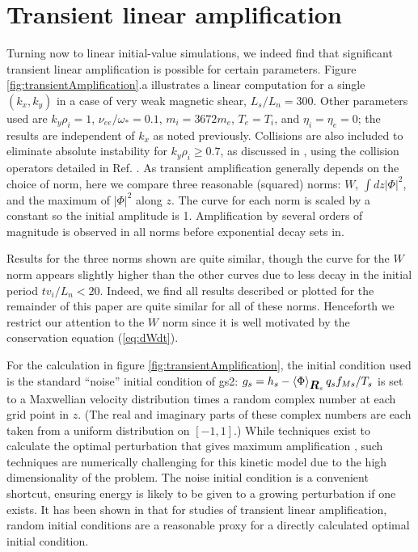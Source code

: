 \documentclass[12pt,superscriptaddress]{revtex4}
\newcommand{\vect}[1]{\mbox{\boldmath $#1$}}
\begin{document}
\section{Transient linear amplification}
\label{sec:transient}

Turning now to linear initial-value simulations,
we indeed find that significant transient linear amplification is possible for certain parameters.
Figure \ref{fig:transientAmplification}.a illustrates
a linear computation for a single $(k_x,k_y)$ in a case of very weak magnetic shear, $L_s / L_n = 300$.
Other parameters used are $k_y \rho_i = 1$, $\nu_{ee} / \omega_* = 0.1$,
$m_i = 3672 m_e$,
$T_e = T_i$, and $\eta_i = \eta_e = 0$;
the results are independent of $k_x$ as noted previously.
Collisions are also included to eliminate absolute instability for $k_y \rho_i \ge 0.7$,
as discussed in \cite{usUniversalInstability},
using the collision operators detailed in Ref. \cite{Abel}.
As transient amplification generally depends on the choice
of norm, here we compare three reasonable (squared) norms: $W$, $\int dz |\Phi|^2$,
and the maximum of $|\Phi|^2$ along $z$.
The curve for each norm is scaled by a constant so the initial amplitude is 1.
Amplification by several orders of magnitude is observed in all norms
before exponential decay sets in.

Results for the three norms shown are quite similar,
though the curve for the $W$ norm appears slightly higher than the other curves
due to less decay in the initial period $t v_i / L_n <20$.
Indeed, we find
all results described or plotted for the remainder of this paper are quite similar
for all of these norms.
Henceforth we restrict our attention to the $W$ norm since it is well motivated
by the conservation equation (\ref{eq:dWdt}).

For the calculation in figure \ref{fig:transientAmplification}, the initial condition used
is the standard ``noise'' initial condition of gs2:
$g_s = h_s - \left< \Phi\right>_{\vect{R}_s} q_s f_{Ms} / T_s$ is set to a Maxwellian velocity distribution
times a random complex number at each grid point in $z$.
(The real and imaginary parts of these complex numbers are each taken from a uniform distribution on $[-1,1]$.)
While techniques exist to calculate the optimal perturbation
that gives maximum amplification \cite{FarrellIoannou, SquirePRL, SquireApJ}, such techniques
are numerically challenging for this kinetic model due to the high dimensionality
of the problem.
The noise initial condition is a convenient shortcut, ensuring energy is likely
to be given to a growing perturbation if one exists.
It has been shown in \cite{Camargo, SquireApJ} that for studies of transient linear
amplification, random initial conditions are a reasonable proxy
for a directly calculated optimal initial condition.
\end{document}
